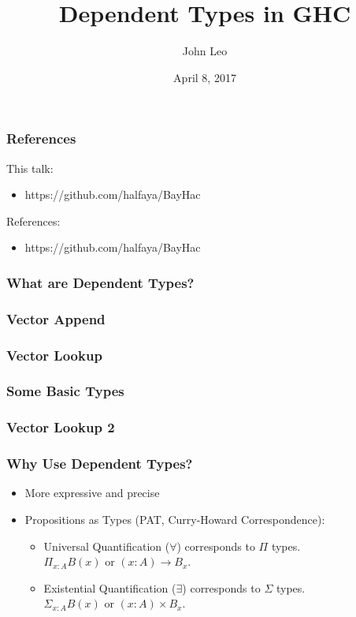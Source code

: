 \documentclass{beamer}
\title{Dependent Types in GHC}
\author{John Leo}
\institute{Halfaya Research}
\date{April 8, 2017}
\begin{document}
 
\frame{\titlepage}
 
\begin{frame}\frametitle{References}
This talk:
\begin{itemize}
\item https://github.com/halfaya/BayHac
\end{itemize}
References:
\begin{itemize}
\item https://github.com/halfaya/BayHac
\end{itemize}
\end{frame}

\begin{frame}\frametitle{What are Dependent Types?}
\end{frame}

\begin{frame}\frametitle{Vector Append}
\end{frame}

\begin{frame}\frametitle{Vector Lookup}
\end{frame}

\begin{frame}\frametitle{Some Basic Types}
\end{frame}

\begin{frame}\frametitle{Vector Lookup 2}
\end{frame}

\begin{frame}\frametitle{Why Use Dependent Types?}
\begin{itemize}
\item More expressive and precise
\item Propositions as Types (PAT, Curry-Howard Correspondence):
\begin{itemize}
\item Universal Quantification ($\forall$) corresponds to $\Pi$ types.\\
  $\Pi_{x : A} B(x)$ or $(x : A) \to B_x$.
\item Existential Quantification ($\exists$) corresponds to $\Sigma$ types.\\
  $\Sigma_{x : A} B(x)$ or $(x : A) \times B_x$.
\end{itemize}
\end{itemize}
\end{frame}
\end{document}
